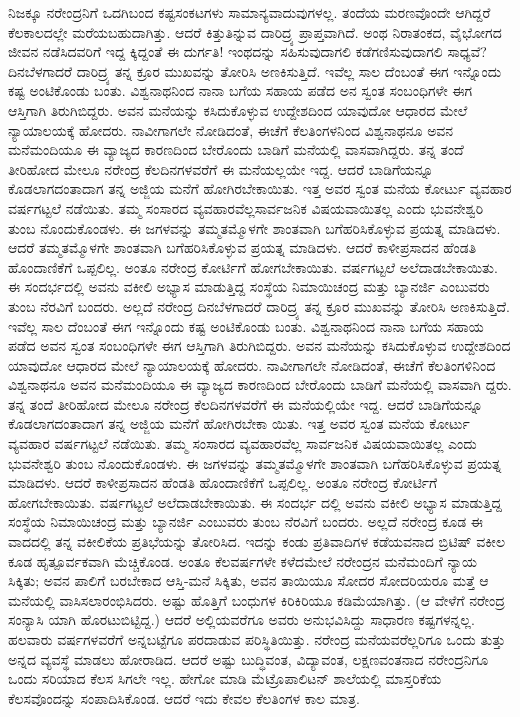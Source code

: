 ನಿಜಕ್ಕೂ ನರೇಂದ್ರನಿಗೆ ಒದಗಿಬಂದ ಕಷ್ಟಸಂಕಟಗಳು ಸಾಮಾನ್ಯವಾದುವುಗಳಲ್ಲ. ತಂದೆಯ ಮರಣವೊಂದೇ ಆಗಿದ್ದರೆ ಕೆಲಕಾಲದಲ್ಲೇ ಮರೆಯಬಹುದಾಗಿತ್ತು. ಆದರೆ ಕಿತ್ತುತಿನ್ನುವ ದಾರಿದ್ರ್ಯ ಪ್ರಾಪ್ತವಾಗಿದೆ. ಅಂಥ ನಿರಾತಂಕದ, ವೈಭೋಗದ ಜೀವನ ನಡೆಸಿದವರಿಗೆ ಇದ್ದ ಕ್ಕಿದ್ದಂತೆ ಈ ದುರ್ಗತಿ! ಇಂಥದನ್ನು ಸಹಿಸುವುದಾಗಲಿ ಕಡೆಗಣಿಸುವುದಾಗಲಿ ಸಾಧ್ಯವೆ? ದಿನಬೆಳಗಾದರೆ ದಾರಿದ್ರ್ಯ ತನ್ನ ಕ್ರೂರ ಮುಖವನ್ನು ತೋರಿಸಿ ಅಣಕಿಸುತ್ತಿದೆ. ಇವೆಲ್ಲ ಸಾಲ ದೆಂಬಂತೆ ಈಗ ಇನ್ನೊಂದು ಕಷ್ಟ ಅಂಟಿಕೊಂಡು ಬಂತು. ವಿಶ್ವನಾಥನಿಂದ ನಾನಾ ಬಗೆಯ ಸಹಾಯ ಪಡೆದ ಅನ ಸ್ವಂತ ಸಂಬಂಧಿಗಳೇ ಈಗ ಆಸ್ತಿಗಾಗಿ ತಿರುಗಿಬಿದ್ದರು. ಅವನ ಮನೆಯನ್ನು ಕಸಿದುಕೊಳ್ಳುವ ಉದ್ದೇಶದಿಂದ ಯಾವುದೋ ಆಧಾರದ ಮೇಲೆ ನ್ಯಾಯಾಲಯಕ್ಕೆ ಹೋದರು. ನಾವೀಗಾಗಲೇ ನೋಡಿದಂತೆ, ಈಚೆಗೆ ಕೆಲತಿಂಗಳನಿಂದ ವಿಶ್ವನಾಥನೂ ಅವನ ಮನೆಮಂದಿಯೂ ಈ ವ್ಯಾಜ್ಯದ ಕಾರಣದಿಂದ ಬೇರೊಂದು ಬಾಡಿಗೆ ಮನೆಯಲ್ಲಿ ವಾಸವಾಗಿದ್ದರು. ತನ್ನ ತಂದೆ ತೀರಿಹೋದ ಮೇಲೂ ನರೇಂದ್ರ ಕೆಲದಿನಗಳವರೆಗೆ ಈ ಮನೆಯಲ್ಲಯೇ ಇದ್ದ. ಆದರೆ ಬಾಡಿಗೆಯನ್ನೂ ಕೊಡಲಾಗದಂತಾದಾಗ ತನ್ನ ಅಜ್ಜಿಯ ಮನೆಗೆ ಹೋಗಿರಬೇಕಾಯಿತು. ಇತ್ತ ಅವರ ಸ್ವಂತ ಮನೆಯ ಕೋರ್ಟು ವ್ಯವಹಾರ ವರ್ಷಗಟ್ಟಲೆ ನಡೆಯಿತು. ತಮ್ಮ ಸಂಸಾರದ ವ್ಯವಹಾರವೆಲ್ಲಸಾರ್ವಜನಿಕ ವಿಷಯವಾಯಿತಲ್ಲ ಎಂದು ಭುವನೇಶ್ವರಿ ತುಂಬ ನೊಂದುಕೊಂಡಳು. ಈ ಜಗಳವನ್ನು ತಮ್ಮತಮ್ಮೊಳಗೇ ಶಾಂತವಾಗಿ ಬಗೆಹರಿಸಿಕೊಳ್ಳುವ ಪ್ರಯತ್ನ ಮಾಡಿದಳು. ಆದರೆ ತಮ್ಮತಮ್ಮೊಳಗೇ ಶಾಂತವಾಗಿ ಬಗೆಹರಿಸಿಕೊಳ್ಳುವ ಪ್ರಯತ್ನ ಮಾಡಿದಳು. ಆದರೆ ಕಾಳೀಪ್ರಸಾದನ ಹೆಂಡತಿ ಹೊಂದಾಣಿಕೆಗೆ ಒಪ್ಪಲಿಲ್ಲ. ಅಂತೂ ನರೇಂದ್ರ ಕೋರ್ಟಿಗೆ ಹೋಗಬೇಕಾಯಿತು. ವರ್ಷಗಟ್ಟಲೆ ಅಲೆದಾಡಬೇಕಾಯಿತು. ಈ ಸಂದರ್ಭದಲ್ಲಿ ಅವನು ವಕೀಲಿ ಅಭ್ಯಾಸ ಮಾಡುತ್ತಿದ್ದ ಸಂಸ್ಥೆಯ ನಿಮಾಯಿಚಂದ್ರ ಮತ್ತು ಬ್ಯಾನರ್ಜಿ ಎಂಬುವರು ತುಂಬ ನೆರವಿಗೆ ಬಂದರು. ಅಲ್ಲದೆ ನರೇಂದ್ರ ದಿನಬೆಳಗಾದರೆ ದಾರಿದ್ರ್ಯ ತನ್ನ ಕ್ರೂರ ಮುಖವನ್ನು ತೋರಿಸಿ ಅಣಕಿಸುತ್ತಿದೆ. ಇವೆಲ್ಲ ಸಾಲ ದೆಂಬಂತೆ ಈಗ ಇನ್ನೊಂದು ಕಷ್ಟ ಅಂಟಿಕೊಂಡು ಬಂತು. ವಿಶ್ವನಾಥನಿಂದ ನಾನಾ ಬಗೆಯ ಸಹಾಯ ಪಡೆದ ಅವನ ಸ್ವಂತ ಸಂಬಂಧಿಗಳೇ ಈಗ ಆಸ್ತಿಗಾಗಿ ತಿರುಗಿಬಿದ್ದರು. ಅವನ ಮನೆಯನ್ನು ಕಸಿದುಕೊಳ್ಳುವ ಉದ್ದೇಶದಿಂದ ಯಾವುದೋ ಆಧಾರದ ಮೇಲೆ ನ್ಯಾಯಾಲಯಕ್ಕೆ ಹೋದರು. ನಾವೀಗಾಗಲೇ ನೋಡಿದಂತೆ, ಈಚೆಗೆ ಕೆಲತಿಂಗಳಿನಿಂದ ವಿಶ್ವನಾಥನೂ ಅವನ ಮನೆಮಂದಿಯೂ ಈ ವ್ಯಾಜ್ಯದ ಕಾರಣದಿಂದ ಬೇರೊಂದು ಬಾಡಿಗೆ ಮನೆಯಲ್ಲಿ ವಾಸವಾಗಿ ದ್ದರು. ತನ್ನ ತಂದೆ ತೀರಿಹೋದ ಮೇಲೂ ನರೇಂದ್ರ ಕೆಲದಿನಗಳವರೆಗೆ ಈ ಮನೆಯಲ್ಲಿಯೇ ಇದ್ದ. ಆದರೆ ಬಾಡಿಗೆಯನ್ನೂ ಕೊಡಲಾಗದಂತಾದಾಗ ತನ್ನ ಅಜ್ಜಿಯ ಮನೆಗೆ ಹೋಗಿರಬೇಕಾ ಯಿತು. ಇತ್ತ ಅವರ ಸ್ವಂತ ಮನೆಯ ಕೋರ್ಟು ವ್ಯವಹಾರ ವರ್ಷಗಟ್ಟಲೆ ನಡೆಯಿತು. ತಮ್ಮ ಸಂಸಾರದ ವ್ಯವಹಾರವೆಲ್ಲ ಸಾರ್ವಜನಿಕ ವಿಷಯವಾಯಿತಲ್ಲ ಎಂದು ಭುವನೇಶ್ವರಿ ತುಂಬ ನೊಂದುಕೊಂಡಳು. ಈ ಜಗಳವನ್ನು ತಮ್ಮತಮ್ಮೊಳಗೇ ಶಾಂತವಾಗಿ ಬಗೆಹರಿಸಿಕೊಳ್ಳುವ ಪ್ರಯತ್ನ ಮಾಡಿದಳು. ಆದರೆ ಕಾಳೀಪ್ರಸಾದನ ಹೆಂಡತಿ ಹೊಂದಾಣಿಕೆಗೆ ಒಪ್ಪಲಿಲ್ಲ. ಅಂತೂ ನರೇಂದ್ರ ಕೋರ್ಟಿಗೆ ಹೋಗಬೇಕಾಯಿತು. ವರ್ಷಗಟ್ಟಲೆ ಅಲೆದಾಡಬೇಕಾಯಿತು. ಈ ಸಂದರ್ಭ ದಲ್ಲಿ ಅವನು ವಕೀಲಿ ಅಭ್ಯಾಸ ಮಾಡುತ್ತಿದ್ದ ಸಂಸ್ಥೆಯ ನಿಮಾಯಿಚಂದ್ರ ಮತ್ತು ಬ್ಯಾನರ್ಜಿ ಎಂಬುವರು ತುಂಬ ನೆರವಿಗೆ ಬಂದರು. ಅಲ್ಲದೆ ನರೇಂದ್ರ ಕೂಡ ಈ ವಾದದಲ್ಲಿ ತನ್ನ ವಕೀಲಿಕೆಯ ಪ್ರತಿಭೆಯನ್ನು ತೋರಿಸಿದ. ಇದನ್ನು ಕಂಡು ಪ್ರತಿವಾದಿಗಳ ಕಡೆಯವನಾದ ಬ್ರಿಟಿಷ್ ವಕೀಲ ಕೂಡ ಹೃತ್ಪೂರ್ವಕವಾಗಿ ಮೆಚ್ಚಿಕೊಂಡ. ಅಂತೂ ಕೆಲವರ್ಷಗಳೇ ಕಳೆದಮೇಲೆ ನರೇಂದ್ರನ ಮನೆಮಂದಿಗೆ ನ್ಯಾಯ ಸಿಕ್ಕಿತು; ಅವನ ಪಾಲಿಗೆ ಬರಬೇಕಾದ ಆಸ್ತಿ-ಮನೆ ಸಿಕ್ಕಿತು, ಅವನ ತಾಯಿಯೂ ಸೋದರ ಸೋದರಿಯರೂ ಮತ್ತೆ ಆ ಮನೆಯಲ್ಲಿ ವಾಸಿಸಲಾರಂಭಿಸಿದರು. ಅಷ್ಟು ಹೊತ್ತಿಗೆ ಬಂಧುಗಳ ಕಿರಿಕಿರಿಯೂ ಕಡಿಮೆಯಾಗಿತ್ತು. (ಆ ವೇಳೆಗೆ ನರೇಂದ್ರ ಸಂನ್ಯಾಸಿ ಯಾಗಿ ಹೊರಟುಬಿಟ್ಟಿದ್ದ.) ಆದರೆ ಅಲ್ಲಿಯವರೆಗೂ ಅವರು ಅನುಭವಿಸಿದ್ದು ಸಾಧಾರಣ ಕಷ್ಟಗಳನ್ನಲ್ಲ. ಹಲವಾರು ವರ್ಷಗಳವರೆಗೆ ಅನ್ನಬಟ್ಟೆಗೂ ಪರದಾಡುವ ಪರಿಸ್ಥಿತಿಯಿತ್ತು. ನರೇಂದ್ರ ಮನೆಯವರೆಲ್ಲರಿಗೂ ಒಂದು ತುತ್ತು ಅನ್ನದ ವ್ಯವಸ್ಥೆ ಮಾಡಲು ಹೋರಾಡಿದ. ಆದರೆ ಅಷ್ಟು ಬುದ್ಧಿವಂತ, ವಿದ್ಯಾವಂತ, ಲಕ್ಷಣವಂತನಾದ ನರೇಂದ್ರನಿಗೂ ಒಂದು ಸರಿಯಾದ ಕೆಲಸ ಸಿಗಲೇ ಇಲ್ಲ. ಹೇಗೋ ಮಾಡಿ ಮೆಟ್ರೊಪಾಲಿಟನ್ ಶಾಲೆಯಲ್ಲಿ ಮಾಸ್ತರಿಕೆಯ ಕೆಲಸವೊಂದನ್ನು ಸಂಪಾದಿಸಿಕೊಂಡ. ಆದರೆ ಇದು ಕೇವಲ ಕೆಲತಿಂಗಳ ಕಾಲ ಮಾತ್ರ.

